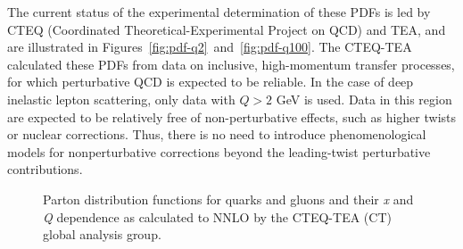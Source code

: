 The current status of the experimental determination of these PDFs is led by CTEQ (Coordinated Theoretical-Experimental Project on QCD) and TEA, and are illustrated in Figures~\ref{fig:pdf-q2}~and~\ref{fig:pdf-q100}. The CTEQ-TEA calculated these PDFs from data on inclusive, high-momentum transfer processes, for which perturbative QCD is expected to be reliable. In the case of deep inelastic lepton scattering, only data with $Q > 2$ GeV is used. Data in this region are expected to be relatively free of non-perturbative effects, such as higher twists or nuclear corrections. Thus, there is no need to introduce phenomenological models for nonperturbative corrections beyond the leading-twist perturbative contributions\cite{Dulat:2015mca}.

\begin{figure}
	\centering
	\hspace{8pt}%
	\caption{Parton distribution functions for quarks and gluons and their \emph{x} and \emph{Q} dependence as calculated to NNLO by the CTEQ-TEA (CT) global analysis group\cite{Dulat:2015mca}.}
	\label{fig:pdf-q2-q100}
\end{figure}

